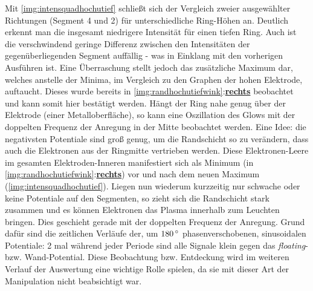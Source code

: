 \documentclass[numbers=noenddot,a4paper]{scrartcl}
\newcommand{\degree}{^\circ}
\newcommand{\tilt}[1]{\textit{#1}}
\newcommand{\fett}[1]{\textbf{#1}}
\begin{document}
					Mit \ref{img:intensquadhochutief} schließt sich der Vergleich zweier ausgewählter Richtungen (Segment 4 und 2) für unterschiedliche Ring-Höhen an. Deutlich erkennt man die insgesamt niedrigere Intensität für einen tiefen Ring. Auch ist die verschwindend geringe Differenz zwischen den Intensitäten der gegenüberliegenden Segment auffällig - was in Einklang mit den vorherigen Ausführen ist. Eine Überraschung stellt jedoch das zusätzliche Maximum dar, welches anstelle der Minima, im Vergleich zu den Graphen der hohen Elektrode, auftaucht. Dieses wurde bereits in \ref{img:randhochutiefwink}:\underline{\fett{rechts}} beobachtet und kann somit hier bestätigt werden. Hängt der Ring nahe genug über der Elektrode (einer Metalloberfläche), so kann eine Oszillation des Glows mit der doppelten Frequenz der Anregung in der Mitte beobachtet werden. Eine Idee: die negativsten Potentiale sind groß genug, um die Randschicht so zu verändern, dass auch die Elektronen aus der Ringmitte vertrieben werden. Diese Elektronen-Leere im gesamten Elektroden-Inneren manifestiert sich als Minimum (in \ref{img:randhochutiefwink}:\underline{\fett{rechts}}) vor und nach dem neuen Maximum (\ref{img:intensquadhochutief}). Liegen nun wiederum kurzzeitig nur schwache oder keine Potentiale auf den Segmenten, so zieht sich die Randschicht stark zusammen und es können Elektronen das Plasma innerhalb zum Leuchten bringen. Dies geschieht gerade mit der doppelten Frequenz der Anregung. Grund dafür sind die zeitlichen Verläufe der, um $\unit[180]{\degree}$ phasenverschobenen, sinusoidalen Potentiale: 2 mal während jeder Periode sind alle Signale klein gegen das \tilt{floating}- bzw. Wand-Potential. Diese Beobachtung bzw. Entdeckung wird im weiteren Verlauf der Auswertung eine wichtige Rolle spielen, da sie mit dieser Art der Manipulation nicht beabsichtigt war.
\end{document}
